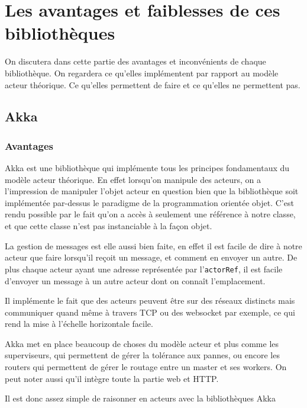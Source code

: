 \documentclass[11pt, a4paper]{article}
\begin{document}
\section{Les avantages et faiblesses de ces bibliothèques}
On discutera dans cette partie des avantages et inconvénients de chaque bibliothèque. On regardera ce qu'elles implémentent par rapport au modèle acteur théorique. Ce qu'elles permettent de faire et ce qu'elles ne permettent pas.

\subsection{Akka}

\subsubsection{Avantages}
Akka est une bibliothèque qui implémente tous les principes fondamentaux du modèle acteur théorique. En effet lorsqu'on manipule des acteurs, on a l'impression de manipuler l'objet acteur en question bien que la bibliothèque soit implémentée par-dessus le paradigme de la programmation orientée objet. C'est rendu possible par le fait qu'on a accès à seulement une référence à notre classe, et que cette classe n'est pas instanciable à la façon objet.
\par La gestion de messages est elle aussi bien faite, en effet il est facile de dire à notre acteur que faire lorsqu'il reçoit un message, et comment en envoyer un autre. De plus chaque acteur ayant une adresse représentée par l'\texttt{actorRef}, il est facile d'envoyer un message à un autre acteur dont on connaît l'emplacement.
\par Il implémente le fait que des acteurs peuvent être sur des réseaux distincts mais communiquer quand même à travers TCP ou des websocket par exemple, ce qui rend la mise à l'échelle horizontale facile.
\par Akka met en place beaucoup de choses du modèle acteur et plus comme les superviseurs, qui permettent de gérer la tolérance aux pannes, ou encore les routers qui permettent de gérer le routage entre un master et ses workers. On peut noter aussi qu'il intègre toute la partie web et HTTP. 
\par Il est donc assez simple de raisonner en acteurs avec la bibliothèques Akka
\end{document}
